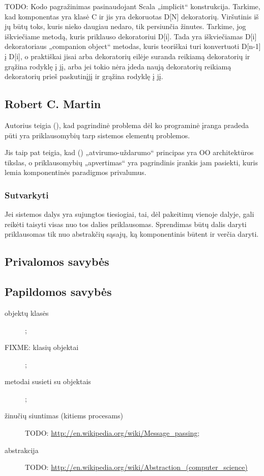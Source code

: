 \begin{enumerate}
\begin{itemize}
        TODO: Kodo pagražinimas pasinaudojant Scala „implicit“
        konstrukcija. Tarkime, kad komponentas yra klasė C ir
        jis yra dekoruotas D[N] dekoratorių. Viršutinis iš jų būtų
        toks, kuris nieko daugiau nedaro, tik persiunčia žinutes.
        Tarkime, jog iškviečiame metodą, kuris priklauso dekoratoriui
        D[i]. Tada yra iškviečiamas D[i] dekoratoriaus „companion
        object“ metodas, kuris teoriškai turi konvertuoti D[n-1] į D[i],
        o praktiškai jisai arba dekoratorių eilėje suranda reikiamą
        dekoratorių ir grąžina rodyklę į jį, arba jei tokio nėra
        įdeda naują dekoratorių reikiamą dekoratorių prieš paskutinįjį
        ir grąžina rodyklę į jį.
    \end{itemize}
\end{enumerate}

\subsection{Robert C. Martin}

Autorius teigia (\cite[4]{design-principles-and-design-patterns}), kad
pagrindinė problema dėl ko programinė įranga pradeda pūti yra
priklausomybių tarp sistemos elementų problemos.

Jis taip pat teigia, kad
(\cite[12]{design-principles-and-design-patterns}) „atvirumo-uždarumo“
principas yra OO architektūros tikslas, o priklausomybių
„apvertimas“  yra pagrindinis įrankis jam
pasiekti, kuris lemia komponentinės paradigmos privalumus.

\subsubsection{Sutvarkyti}

Jei sistemos dalys yra sujungtos tiesiogiai, tai, dėl pakeitimų vienoje
dalyje, gali reikėti taisyti visas nuo tos dalies priklausomas. Sprendimas
būtų dalis daryti priklausomas tik nuo abstrakčių sąsajų, ką komponentinis
būtent ir verčia daryti.

\subsection{Privalomos savybės}
\subsection{Papildomos savybės}

\begin{description}
  \item[objektų klasės] ;
  \item[FIXME: klasių objektai] ;
  \item[metodai susieti su objektais] ;
  \item[žinučių siuntimas (kitiems procesams)] 
    TODO: \url{http://en.wikipedia.org/wiki/Message_passing};
  \item[abstrakcija] 
    TODO: \url{http://en.wikipedia.org/wiki/Abstraction_(computer_science)}
\end{description}
